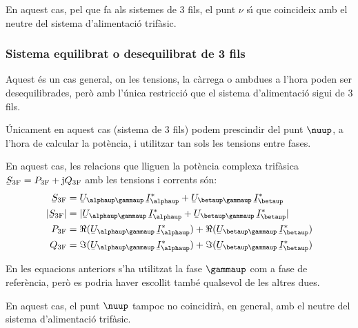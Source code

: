 En aquest cas, pel que fa als sistemes de 3 fils,  el punt $\nu$ s\'{\i}
que coincideix amb el neutre del sistema d'alimentaci\'{o} trif\`{a}sic.

\subsubsection{Sistema equilibrat o desequilibrat de 3 fils}

Aquest \'{e}s un cas  general, on les tensions, la c\`{a}rrega o ambdues a
l'hora  poden ser desequilibrades, per\`{o} amb l'\'{u}nica restricci\'{o} que
el sistema d'alimentaci\'{o} sigui de 3 fils.

 \'{U}nicament en aquest cas (sistema de 3 fils) podem prescindir del punt $\nuup$, a l'hora de
calcular la pot\`{e}ncia, i utilitzar tan sols les tensions entre fases.

En aquest cas, les relacions que lliguen la pot\`{e}ncia complexa
trif\`{a}sica $\cmplx{S}\ped{3F} = P\ped{3F} + \ju Q\ped{3F}$ amb les
tensions i corrents s\'{o}n:
\begin{align}
    \cmplx{S}\ped{3F} &= \cmplx{U}_{\alphaup\gammaup} \,\cmplx{I}_\alphaup^*
     +  \cmplx{U}_{\betaup\gammaup} \,\cmplx{I}_\betaup^*  \label{eq:s_3f_3fils}\\
    |\cmplx{S}\ped{3F}| &= |\cmplx{U}_{\alphaup\gammaup}\, \cmplx{I}_\alphaup^* +
    \cmplx{U}_{\betaup\gammaup}\, \cmplx{I}_\betaup^*| \\
    P\ped{3F} &= \Re(\cmplx{U}_{\alphaup\gammaup}\, \cmplx{I}_\alphaup^*) +
    \Re(\cmplx{U}_{\betaup\gammaup}\, \cmplx{I}_\betaup^*) \\
    Q\ped{3F} &= \Im(\cmplx{U}_{\alphaup\gammaup} \,\cmplx{I}_\alphaup^*) +
    \Im(\cmplx{U}_{\betaup\gammaup} \,\cmplx{I}_\betaup^*)
\end{align}

En les equacions anteriors s'ha utilitzat la fase $\gammaup$ com a
fase de refer\`{e}ncia, per\`{o} es podria haver escollit tamb\'{e} qualsevol de
les altres dues.

En aquest cas, el punt $\nuup$ tampoc no coincidir\`{a}, en general, amb
el neutre del sistema d'alimentaci\'{o} trif\`{a}sic.

